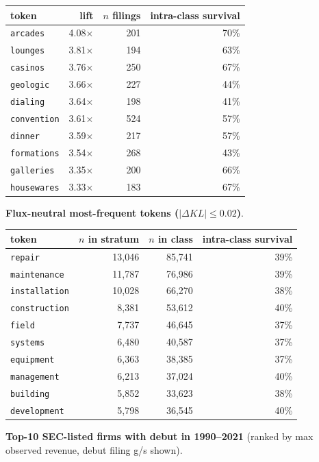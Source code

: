 \begin{tabular}{lrrr}
\toprule
token & lift & $n$ filings & intra-class survival \\
\midrule
\texttt{arcades} & 4.08$\times$ & 201 & 70\% \\
\texttt{lounges} & 3.81$\times$ & 194 & 63\% \\
\texttt{casinos} & 3.76$\times$ & 250 & 67\% \\
\texttt{geologic} & 3.66$\times$ & 227 & 44\% \\
\texttt{dialing} & 3.64$\times$ & 198 & 41\% \\
\texttt{convention} & 3.61$\times$ & 524 & 57\% \\
\texttt{dinner} & 3.59$\times$ & 217 & 57\% \\
\texttt{formations} & 3.54$\times$ & 268 & 43\% \\
\texttt{galleries} & 3.35$\times$ & 200 & 66\% \\
\texttt{housewares} & 3.33$\times$ & 183 & 67\% \\
\bottomrule
\end{tabular}

\textbf{Flux-neutral most-frequent tokens ($|\Delta KL|\leq 0.02$)}.

\begin{tabular}{lrrr}
\toprule
token & $n$ in stratum & $n$ in class & intra-class survival \\
\midrule
\texttt{repair} & 13,046 & 85,741 & 39\% \\
\texttt{maintenance} & 11,787 & 76,986 & 39\% \\
\texttt{installation} & 10,028 & 66,270 & 38\% \\
\texttt{construction} & 8,381 & 53,612 & 40\% \\
\texttt{field} & 7,737 & 46,645 & 37\% \\
\texttt{systems} & 6,480 & 40,587 & 37\% \\
\texttt{equipment} & 6,363 & 38,385 & 37\% \\
\texttt{management} & 6,213 & 37,024 & 40\% \\
\texttt{building} & 5,852 & 33,623 & 38\% \\
\texttt{development} & 5,798 & 36,545 & 40\% \\
\bottomrule
\end{tabular}

\textbf{Top-10 SEC-listed firms with debut in 1990--2021} (ranked by max observed revenue, debut filing g/s shown).


